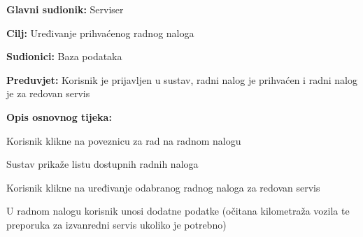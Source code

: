 					\noindent {}
					\begin{packed_item}

						\item \textbf{Glavni sudionik: } Serviser
						\item  \textbf{Cilj:} Uređivanje prihvaćenog radnog naloga
						\item  \textbf{Sudionici:} Baza podataka
						\item  \textbf{Preduvjet:} Korisnik je prijavljen u sustav, radni nalog je prihvaćen i radni nalog je za redovan servis
						\item  \textbf{Opis osnovnog tijeka:}

						\item[] \begin{packed_enum}

							\item Korisnik klikne na poveznicu za rad na radnom nalogu
							\item Sustav prikaže listu dostupnih radnih naloga
							\item Korisnik klikne na uređivanje odabranog radnog naloga za redovan servis
							\item U radnom nalogu korisnik unosi dodatne podatke (očitana kilometraža vozila te preporuka za izvanredni servis ukoliko je potrebno)
							
						\end{packed_enum}
					\end{packed_item}


